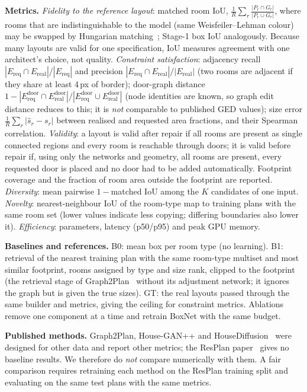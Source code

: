 \documentclass[conference]{IEEEtran}
\begin{document}
\textbf{Metrics.} \emph{Fidelity to the reference layout}: matched room IoU, $\frac1{R}\sum_{r}\frac{|P_r\cap G_r|}{|P_r\cup G_r|}$, where rooms that are indistinguishable to the model (same Weisfeiler--Lehman colour) may be swapped by Hungarian matching~\cite{kuhn1955hungarian,shervashidze2011wl}; Stage-1 box IoU analogously. Because many layouts are valid for one specification, IoU measures agreement with one architect's choice, not quality. \emph{Constraint satisfaction}: adjacency recall $|E_{\mathrm{req}}\cap E_{\mathrm{real}}|/|E_{\mathrm{req}}|$ and precision $|E_{\mathrm{req}}\cap E_{\mathrm{real}}|/|E_{\mathrm{real}}|$ (two rooms are adjacent if they share at least 4\,px of border); door-graph distance $1-|E^{\mathrm{door}}_{\mathrm{req}}\cap E^{\mathrm{door}}_{\mathrm{real}}|/|E^{\mathrm{door}}_{\mathrm{req}}\cup E^{\mathrm{door}}_{\mathrm{real}}|$ (node identities are known, so graph edit distance reduces to this; it is \emph{not} comparable to published GED values); size error $\frac1R\sum_r|\hat s_r-s_r|$ between realised and requested area fractions, and their Spearman correlation. \emph{Validity}: a layout is valid after repair if all rooms are present as single connected regions and every room is reachable through doors; it is valid before repair if, using only the networks and geometry, all rooms are present, every requested door is placed and no door had to be added automatically. Footprint coverage and the fraction of room area outside the footprint are reported. \emph{Diversity}: mean pairwise $1-$matched IoU among the $K$ candidates of one input. \emph{Novelty}: nearest-neighbour IoU of the room-type map to training plans with the same room set (lower values indicate less copying; differing boundaries also lower it). \emph{Efficiency}: parameters, latency (p50/p95) and peak GPU memory.

\textbf{Baselines and references.} B0: mean box per room type (no learning). B1: retrieval of the nearest training plan with the same room-type multiset and most similar footprint, rooms assigned by type and size rank, clipped to the footprint (the retrieval stage of Graph2Plan~\cite{hu2020graph2plan} without its adjustment network; it ignores the graph but is given the true sizes). GT: the real layouts passed through the same builder and metrics, giving the ceiling for constraint metrics. Ablations remove one component at a time and retrain BoxNet with the same budget.

\textbf{Published methods.} Graph2Plan, House-GAN++ and HouseDiffusion~\cite{hu2020graph2plan,nauata2021housegan++,shabani2023housediffusion} were designed for other data and report other metrics; the ResPlan paper~\cite{abouagour2025resplan} gives no baseline results. We therefore do \emph{not} compare numerically with them. A fair comparison requires retraining each method on the ResPlan training split and evaluating on the same test plans with the same metrics.
\end{document}
